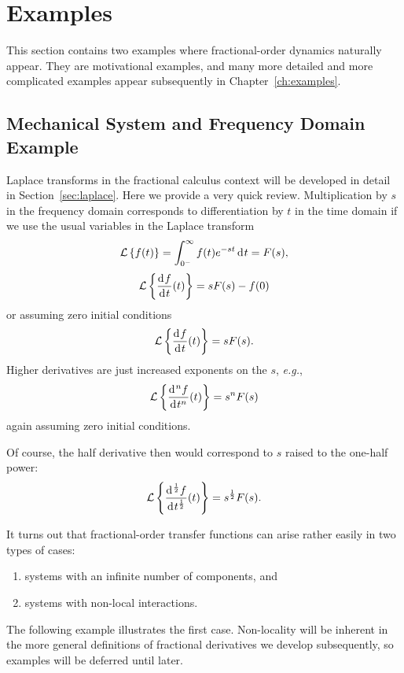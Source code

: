 \section{Examples}

This section contains two examples where fractional-order dynamics naturally appear. They are motivational examples, and many more detailed and more complicated examples appear subsequently in Chapter~\ref{ch:examples}. 
\subsection{Mechanical System and Frequency Domain Example}
\label{sec:introexamples}

Laplace transforms in the fractional calculus context will be developed in detail in Section~\ref{sec:laplace}. Here we provide a very quick review. Multiplication by $s$ in the frequency domain corresponds to differentiation by $t$ in the time domain if we use the
usual variables in the Laplace transform
\begin{equation}
  \mathcal{L} \left\{ f(t) \right\} = \int_{0^-}^\infty f(t) e^{-s t} \operatorname{d}\hspace*{-1pt} t = F(s),
\end{equation}
\ie
\begin{equation}
  \mathcal L \left\{ \frac{\operatorname{d}\hspace*{-1pt} f}{\operatorname{d}\hspace*{-1pt} t}(t) \right\} = s F(s) - f(0)
\end{equation}
or assuming zero initial conditions
\begin{equation}
  \mathcal L \left\{ \frac{\operatorname{d}\hspace*{-1pt} f}{\operatorname{d}\hspace*{-1pt} t}(t) \right\} = s F(s).
\end{equation}
Higher derivatives are just increased exponents on the $s$, \textit{e.g.}, 
\begin{equation}
  \mathcal L \left\{ \frac{\operatorname{d}\hspace*{-1pt}^n f}{\operatorname{d}\hspace*{-1pt} t^n}(t) \right\} = s^n F(s)
\end{equation}
again assuming zero initial conditions.

Of course, the half derivative then would correspond to $s$ raised to the one-half power:
\begin{equation}
  \mathcal L \left\{ \frac{\operatorname{d}\hspace*{-1pt}^\frac{1}{2} f}{\operatorname{d}\hspace*{-1pt} t^\frac{1}{2}}(t) \right\} = s^\frac{1}{2} F(s).
\end{equation}

It turns out that fractional-order transfer functions can arise rather easily in two types of cases:
\begin{enumerate}
  \item systems with an infinite number of components, and
  \item systems with non-local interactions.
\end{enumerate}
The following example illustrates the first case. Non-locality will be inherent in the more general definitions of fractional derivatives we develop subsequently, so examples will be deferred until later.

